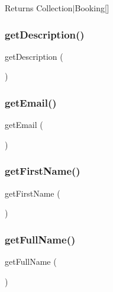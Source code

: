 \begin{DoxyReturn}{Returns}
Collection$\vert$\+Booking\mbox{[}\mbox{]} 
\end{DoxyReturn}
\mbox{\label{class_app_1_1_entity_1_1_user_a2e7bb35c71bf1824456ceb944cb7a845}} 
\subsubsection{\texorpdfstring{getDescription()}{getDescription()}}
{\footnotesize\ttfamily get\+Description (\begin{DoxyParamCaption}{ }\end{DoxyParamCaption})}

\mbox{\label{class_app_1_1_entity_1_1_user_a02a01849f28e2535e888ae4ec87b20f2}} 
\subsubsection{\texorpdfstring{getEmail()}{getEmail()}}
{\footnotesize\ttfamily get\+Email (\begin{DoxyParamCaption}{ }\end{DoxyParamCaption})}

\mbox{\label{class_app_1_1_entity_1_1_user_ace5f32fc99c7c5989f7576755fc60972}} 
\subsubsection{\texorpdfstring{getFirstName()}{getFirstName()}}
{\footnotesize\ttfamily get\+First\+Name (\begin{DoxyParamCaption}{ }\end{DoxyParamCaption})}

\mbox{\label{class_app_1_1_entity_1_1_user_a2b284f11184201a8ba8a92de57f93580}} 
\subsubsection{\texorpdfstring{getFullName()}{getFullName()}}
{\footnotesize\ttfamily get\+Full\+Name (\begin{DoxyParamCaption}{ }\end{DoxyParamCaption})}

